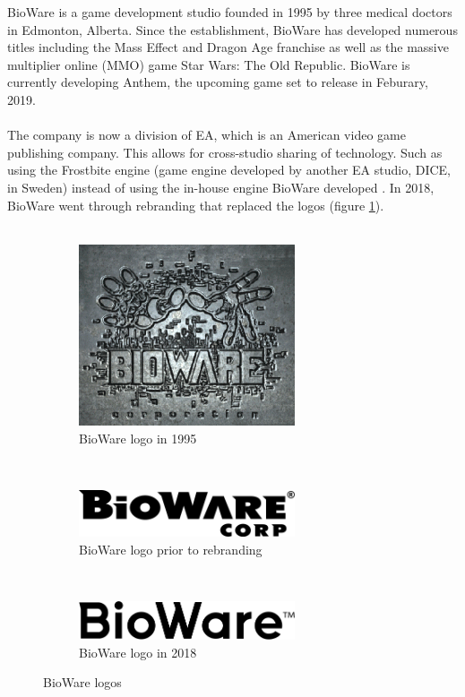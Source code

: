 \documentclass[10pt,letterpaper]{article}
\begin{document}
BioWare is a game development studio founded in 1995 by three medical doctors in Edmonton, Alberta\cite{bioware-wiki}. Since the establishment, BioWare has developed numerous titles including the Mass Effect and Dragon Age franchise as well as the massive multiplier online (MMO) game Star Wars: The Old Republic. BioWare is currently developing Anthem, the upcoming game set to release in Feburary, 2019.\\
\\
The company is now a division of EA, which is an American video game publishing company. This allows for cross-studio sharing of technology. Such as using the Frostbite engine (game engine developed by another EA studio, DICE, in Sweden) instead of using the in-house engine BioWare developed \cite{frostbite-wiki, eadice-wiki}. In 2018, BioWare went through rebranding that replaced the logos (figure \ref{fig:biowarelogos}).\cite{bioware-wiki}\\
\\
\begin{figure}[H]
	\centering
	\begin{subfigure}[c]{0.3\textwidth}
		\centering
		\includegraphics[width=0.7\textwidth]{assets/logo1995}
		\caption{BioWare logo in 1995}
	\end{subfigure}
	~
	\begin{subfigure}[c]{0.3\textwidth}
		\centering
		\includegraphics[width=0.7\textwidth]{assets/logo2005}
		\caption{BioWare logo prior to rebranding}
	\end{subfigure}
	~
	\begin{subfigure}[c]{0.3\textwidth}
		\centering
		\includegraphics[width=0.7\textwidth]{assets/logo2018}
		\caption{BioWare logo in 2018}
	\end{subfigure}
	\caption{BioWare logos}
	\label{fig:biowarelogos}
\end{figure}
\end{document}
